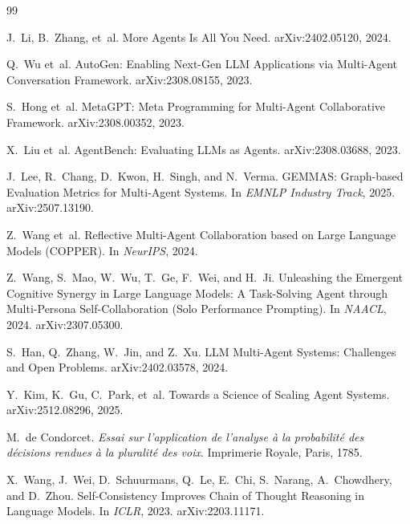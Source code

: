 \documentclass{article}
\begin{document}

\begin{thebibliography}{99}

J.~Li, B.~Zhang, et~al.
\newblock More Agents Is All You Need.
\newblock arXiv:2402.05120, 2024.

Q.~Wu et~al.
\newblock AutoGen: Enabling Next-Gen LLM Applications via Multi-Agent
  Conversation Framework.
\newblock arXiv:2308.08155, 2023.

S.~Hong et~al.
\newblock MetaGPT: Meta Programming for Multi-Agent Collaborative Framework.
\newblock arXiv:2308.00352, 2023.

X.~Liu et~al.
\newblock AgentBench: Evaluating LLMs as Agents.
\newblock arXiv:2308.03688, 2023.

J.~Lee, R.~Chang, D.~Kwon, H.~Singh, and N.~Verma.
\newblock GEMMAS: Graph-based Evaluation Metrics for Multi-Agent Systems.
\newblock In \emph{EMNLP Industry Track}, 2025.
\newblock arXiv:2507.13190.

Z.~Wang et~al.
\newblock Reflective Multi-Agent Collaboration based on Large Language Models
  (COPPER).
\newblock In \emph{NeurIPS}, 2024.

Z.~Wang, S.~Mao, W.~Wu, T.~Ge, F.~Wei, and H.~Ji.
\newblock Unleashing the Emergent Cognitive Synergy in Large Language Models:
  A Task-Solving Agent through Multi-Persona Self-Collaboration (Solo Performance Prompting).
\newblock In \emph{NAACL}, 2024.
\newblock arXiv:2307.05300.

S.~Han, Q.~Zhang, W.~Jin, and Z.~Xu.
\newblock LLM Multi-Agent Systems: Challenges and Open Problems.
\newblock arXiv:2402.03578, 2024.

Y.~Kim, K.~Gu, C.~Park, et~al.
\newblock Towards a Science of Scaling Agent Systems.
\newblock arXiv:2512.08296, 2025.

M.~de Condorcet.
\newblock \emph{Essai sur l'application de l'analyse \`a la probabilit\'e des
  d\'ecisions rendues \`a la pluralit\'e des voix}.
\newblock Imprimerie Royale, Paris, 1785.

X.~Wang, J.~Wei, D.~Schuurmans, Q.~Le, E.~Chi, S.~Narang, A.~Chowdhery, and D.~Zhou.
\newblock Self-Consistency Improves Chain of Thought Reasoning in Language Models.
\newblock In \emph{ICLR}, 2023.
\newblock arXiv:2203.11171.


\end{thebibliography}
\end{document}

